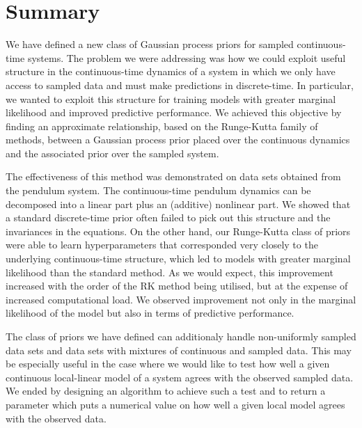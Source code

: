 







\section{Summary}
We have defined a new class of Gaussian process priors for sampled continuous-time systems. The problem we were addressing was how we could exploit useful structure in the continuous-time dynamics of a system in which we only have access to sampled data and must make predictions in discrete-time. In particular, we wanted to exploit this structure for training models with greater marginal likelihood and improved predictive performance. We achieved this objective by finding an approximate relationship, based on the Runge-Kutta family of methods, between a Gaussian process prior placed over the continuous dynamics and the associated prior over the sampled system. 


The effectiveness of this method was demonstrated on data sets obtained from the pendulum system. The continuous-time pendulum dynamics can be decomposed into a linear part plus an (additive) nonlinear part. We showed that a standard discrete-time prior often failed to pick out this structure and the invariances in the equations. On the other hand, our Runge-Kutta class of priors were able to learn hyperparameters that corresponded very closely to the underlying continuous-time structure, which led to models with greater marginal likelihood than the standard method. As we would expect, this improvement increased with the order of the RK method being utilised, but at the expense of increased computational load. We observed improvement not only in the marginal likelihood of the model but also in terms of predictive performance.


The class of priors we have defined can additionaly handle non-uniformly sampled data sets and data sets with mixtures of continuous and sampled data. This may be especially useful in the case where we would like to test how well a given continuous local-linear model of a system agrees with the observed sampled data. We ended by designing an algorithm to achieve such a test and to return a parameter which puts a numerical value on how well a given local model agrees with the observed data.


